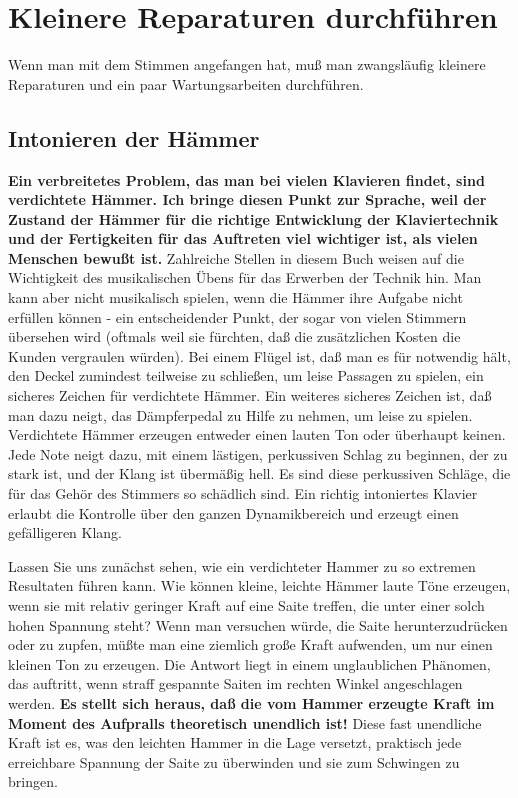
\chapter{Kleinere Reparaturen durchführen}\hypertarget{c2_7}{}

Wenn man mit dem Stimmen angefangen hat, muß man zwangsläufig kleinere Reparaturen und ein paar Wartungsarbeiten durchführen.
 

\hypertarget{c2_7a}{}
\section{Intonieren der Hämmer}\hypertarget{c2_7_hamm}{}

\textbf{Ein verbreitetes Problem, das man bei vielen Klavieren findet, sind verdichtete Hämmer.
Ich bringe diesen Punkt zur Sprache, weil der Zustand der Hämmer für die richtige Entwicklung der Klaviertechnik und der Fertigkeiten für das Auftreten viel wichtiger ist, als vielen Menschen bewußt ist.}
Zahlreiche Stellen in diesem Buch weisen auf die Wichtigkeit des musikalischen Übens für das Erwerben der Technik hin.
Man kann aber nicht musikalisch spielen, wenn die Hämmer ihre Aufgabe nicht erfüllen können - ein entscheidender Punkt, der sogar von vielen Stimmern übersehen wird (oftmals weil sie fürchten, daß die zusätzlichen Kosten die Kunden vergraulen würden).
Bei einem Flügel ist, daß man es für notwendig hält, den Deckel zumindest teilweise zu schließen, um leise Passagen zu spielen, ein sicheres Zeichen für verdichtete Hämmer.
Ein weiteres sicheres Zeichen ist, daß man dazu neigt, das Dämpferpedal zu Hilfe zu nehmen, um leise zu spielen.
Verdichtete Hämmer erzeugen entweder einen lauten Ton oder überhaupt keinen.
Jede Note neigt dazu, mit einem lästigen, perkussiven Schlag zu beginnen, der zu stark ist, und der Klang ist übermäßig hell.
Es sind diese perkussiven Schläge, die für das Gehör des Stimmers so schädlich sind.
Ein richtig intoniertes Klavier erlaubt die Kontrolle über den ganzen Dynamikbereich und erzeugt einen gefälligeren Klang.

Lassen Sie uns zunächst sehen, wie ein verdichteter Hammer zu so extremen Resultaten führen kann.
Wie können kleine, leichte Hämmer laute Töne erzeugen, wenn sie mit relativ geringer Kraft auf eine Saite treffen, die unter einer solch hohen Spannung steht?
Wenn man versuchen würde, die Saite herunterzudrücken oder zu zupfen, müßte man eine ziemlich große Kraft aufwenden, um nur einen kleinen Ton zu erzeugen.
Die Antwort liegt in einem unglaublichen Phänomen, das auftritt, wenn straff gespannte Saiten im rechten Winkel angeschlagen werden.
\textbf{Es stellt sich heraus, daß die vom Hammer erzeugte Kraft im Moment des Aufpralls theoretisch unendlich ist!}
Diese fast unendliche Kraft ist es, was den leichten Hammer in die Lage versetzt, praktisch jede erreichbare Spannung der Saite zu überwinden und sie zum Schwingen zu bringen.

